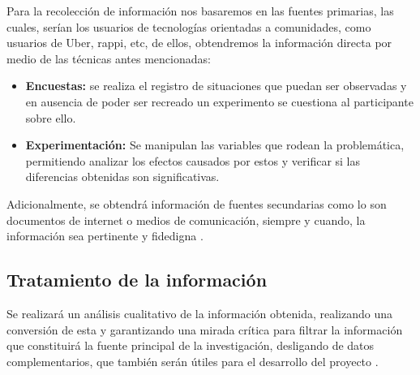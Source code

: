 	{Para la recolección de información nos basaremos en las fuentes primarias, las cuales, serían los usuarios de tecnologías orientadas a comunidades, como usuarios de Uber, rappi, etc, de ellos, obtendremos la información directa por medio de las técnicas antes mencionadas:
		
	\begin{itemize}
		\item \textbf{Encuestas:} se realiza el registro de situaciones que puedan ser observadas y en ausencia de poder ser recreado un experimento se cuestiona al participante sobre ello.
		
		\item \textbf{Experimentación:} Se manipulan las variables que rodean la problemática, permitiendo analizar los efectos causados por estos y verificar si las diferencias obtenidas son significativas.
	\end{itemize}
		
	Adicionalmente, se obtendrá información de fuentes secundarias como lo son documentos de internet o medios de comunicación, siempre y cuando, la información sea pertinente y fidedigna \cite{learn}.}
	
	\subsection{Tratamiento de la información}
	
	{Se realizará un análisis cualitativo de la información obtenida, realizando una conversión de esta y garantizando una mirada crítica para filtrar la información que constituirá la fuente principal de la investigación, desligando de datos complementarios, que también serán útiles para el desarrollo del proyecto \cite{methoqual}.}
